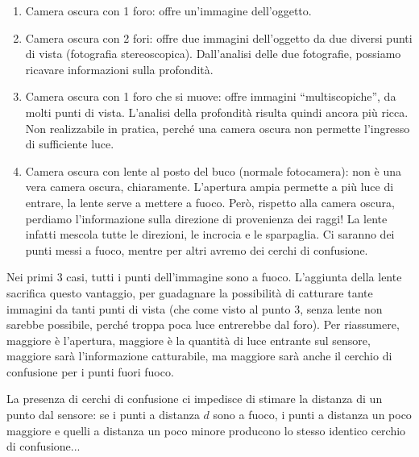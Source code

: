 \documentclass[a4paper,11pt]{article}
\begin{document}
\begin{enumerate}
    \item Camera oscura con 1 foro: offre un'immagine dell'oggetto.
    \item Camera oscura con 2 fori: offre due immagini dell'oggetto da due diversi punti di vista (fotografia stereoscopica). Dall'analisi delle due fotografie, possiamo 
    ricavare informazioni sulla profondità.
    \item Camera oscura con 1 foro che si muove: offre immagini ``multiscopiche'', da molti punti di vista. L'analisi della profondità risulta quindi ancora più ricca.
    Non realizzabile in pratica, perché una camera oscura non permette l'ingresso di sufficiente luce.
    \item Camera oscura con lente al posto del buco (normale fotocamera): non è una vera camera oscura, chiaramente. L'apertura ampia permette a più luce di entrare, la lente
    serve a mettere a fuoco. Però, rispetto alla camera oscura, perdiamo l'informazione sulla direzione di provenienza dei raggi! La lente infatti mescola tutte le
    direzioni, le incrocia e le sparpaglia. Ci saranno dei punti messi a fuoco, mentre per altri avremo dei cerchi di confusione.
\end{enumerate}
Nei primi 3 casi, tutti i punti dell'immagine sono a fuoco. L'aggiunta della lente sacrifica questo vantaggio, per guadagnare
la possibilità di catturare tante immagini da tanti punti di vista (che come visto al punto 3, senza lente non sarebbe possibile, perché troppa poca luce entrerebbe dal foro).
Per riassumere, maggiore è l'apertura, maggiore è la quantità di luce entrante sul sensore, maggiore sarà l'informazione
catturabile, ma maggiore sarà anche il cerchio di confusione per i punti fuori fuoco.
\par
La presenza di cerchi di confusione ci impedisce di stimare la distanza di un punto dal sensore:
se i punti a distanza $d$ sono a fuoco, i punti a distanza un poco maggiore e quelli a distanza un poco minore producono lo stesso identico cerchio di confusione...
\end{document}
